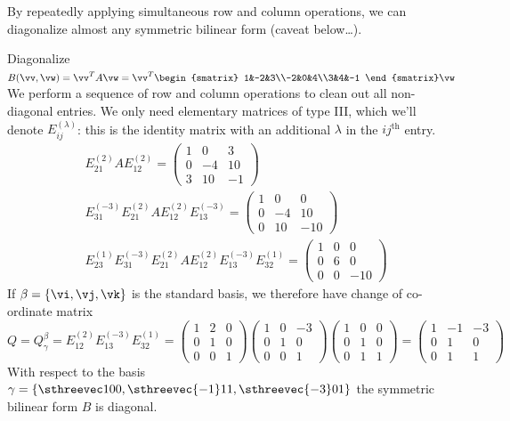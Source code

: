 By repeatedly applying simultaneous row and column operations, we can diagonalize almost any symmetric bilinear form (caveat below\ldots).

\begin{example}{}{}
Diagonalize $B(\vv,\vw)=\vv^TA\vw=\vv^T
\begin{smatrix}
	1&-2&3\\-2&0&4\\3&4&-1
\end{smatrix}\vw$\\
We perform a sequence of row and column operations to clean out all non-diagonal entries. We only need elementary matrices of type III, which we'll denote $E_{ij}^{(\lambda)}$: this is the identity matrix with an additional $\lambda$ in the $ij^\text{th}$ entry.
\begin{align*}
&E_{21}^{(2)}AE_{12}^{(2)}=\begin{pmatrix}
	1&0&3\\0&-4&10\\3&10&-1
\end{pmatrix} \tag{add twice the first row to the second, columns similarly}\\
&E_{31}^{(-3)}E_{21}^{(2)}AE_{12}^{(2)}E_{13}^{(-3)}=\begin{pmatrix}
	1&0&0\\0&-4&10\\0&10&-10
\end{pmatrix} \tag{subtract $3$ times the first row from the third, etc.}\\
&E_{23}^{(1)}E_{31}^{(-3)}E_{21}^{(2)}AE_{12}^{(2)}E_{13}^{(-3)}E_{32}^{(1)}=\begin{pmatrix}
	1&0&0\\0&6&0\\0&0&-10
\end{pmatrix} \tag{add the third row to the second, etc.}
\end{align*}
If $\beta=\{\vi,\vj,\vk\}$ is the standard basis, we therefore have change of co-ordinate matrix
\[Q=Q_\gamma^\beta=E_{12}^{(2)}E_{13}^{(-3)}E_{32}^{(1)}
=\begin{pmatrix}
	1&2&0\\0&1&0\\0&0&1
\end{pmatrix}
\begin{pmatrix}
	1&0&-3\\0&1&0\\0&0&1
\end{pmatrix}
\begin{pmatrix}
	1&0&0\\0&1&0\\0&1&1
\end{pmatrix}
=\begin{pmatrix}
	1&-1&-3\\0&1&0\\0&1&1
\end{pmatrix}\]
With respect to the basis $\gamma=\left\{\sthreevec 100,\sthreevec{-1}11,\sthreevec{-3}01\right\}$ the symmetric bilinear form $B$ is diagonal.
\end{example}

